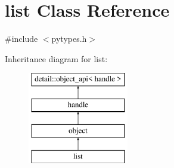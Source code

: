 \hypertarget{classlist}{}\section{list Class Reference}
\label{classlist}


{\ttfamily \#include $<$pytypes.\+h$>$}

Inheritance diagram for list\+:\begin{figure}[H]
\begin{center}
\leavevmode
\includegraphics[height=4.000000cm]{classlist}
\end{center}
\end{figure}
